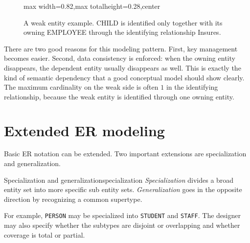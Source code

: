 \documentclass[11pt,a4paper,openany]{book}
\newcommand{\keyattr}[1]{\underline{#1}}
\begin{document}
\begin{figure}[tbp]
\centering
\begin{adjustbox}{max width=0.82\linewidth,max totalheight=0.28\textheight,center}
\end{adjustbox}
\caption{A weak entity example. CHILD is identified only together with its owning EMPLOYEE through the identifying relationship Insures.}
\label{fig:er-weak-entity}
\end{figure}

There are two good reasons for this modeling pattern. First, key management becomes easier. Second, data consistency is enforced: when the owning entity disappears, the dependent entity usually disappears as well. This is exactly the kind of semantic dependency that a good conceptual model should show clearly. The maximum cardinality on the weak side is often \(1\) in the identifying relationship, because the weak entity is identified through one owning entity.

\section{Extended ER modeling}
Basic ER notation can be extended. Two important extensions are specialization and generalization.

\begin{definition}{Specialization and generalization}{specialization}
\emph{Specialization} divides a broad entity set into more specific sub entity sets. \emph{Generalization} goes in the opposite direction by recognizing a common supertype.
\end{definition}

For example, \texttt{PERSON} may be specialized into \texttt{STUDENT} and \texttt{STAFF}. The designer may also specify whether the subtypes are disjoint or overlapping and whether coverage is total or partial.
\end{document}
